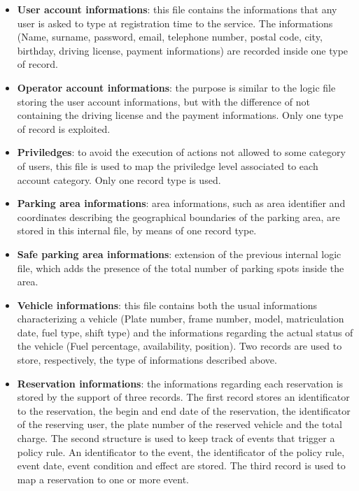 \begin{itemize}
	\item \textbf{User account informations}: this file contains the informations that any user is asked to type at registration time to the service. 
The informations (Name, surname, password, email, telephone number, postal code, city, birthday, driving license, payment informations) are recorded inside one type of record.

	\item \textbf{Operator account informations}: the purpose is similar to the logic file storing the user account informations, but with the difference of not containing the driving license and the payment informations. Only one type of record is exploited.

	\item \textbf{Priviledges}: to avoid the execution of actions not allowed to some category of users, this file is used to map the priviledge level associated to each account category. Only one record type is used.

	\item \textbf{Parking area informations}: area informations, such as area identifier and coordinates describing the geographical boundaries of the parking area, are stored in this internal file, by means of one record type.

	\item \textbf{Safe parking area informations}: extension of the previous internal logic file, which adds the presence of the total number of parking spots inside the area.

	\item \textbf{Vehicle informations}: this file contains both the usual informations characterizing a vehicle (Plate number, frame number, model, matriculation date, fuel type, shift type) and the informations regarding the actual status of the vehicle (Fuel percentage, availability, position). Two records are used to store, respectively, the type of informations described above.

	\item \textbf{Reservation informations}: the informations regarding each reservation is stored by the support of three records. The first record stores an identificator to the reservation, the begin and end date of the reservation, the identificator of the reserving user, the plate number of the reserved vehicle and the total charge.
The second structure is used to keep track of events that trigger a policy rule. An identificator to the event, the identificator of the policy rule, event date, event condition and effect are stored.
The third record is used to map a reservation to one or more event.


\end{itemize}
